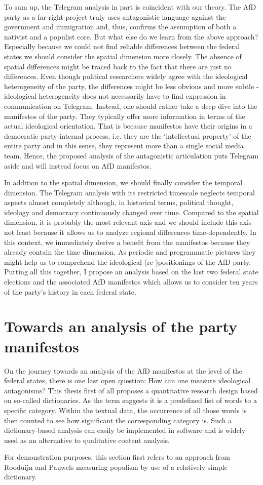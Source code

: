 \documentclass[a4paper]{scrreprt}
\begin{document}
To sum up, the Telegram analysis in part is coincident with our theory. The AfD party as a far-right project truly uses antagonistic language against the government and immigration and, thus, confirms the assumption of both a nativist and a populist core. But what else do we learn from the above approach? Especially because we could not find reliable differences between the federal states we should consider the spatial dimension more closely. The absence of spatial differences might be traced back to the fact that there are just no differences. Even though political researchers widely agree with the ideological heterogeneity of the party, the differences might be less obvious and more subtle - ideological heterogeneity does not necessarily have to find expression in communication on Telegram. Instead, one should rather take a deep dive into the manifestos of the party. They typically offer more information in terms of the actual ideological orientation. \cite[p.~7]{pfahl:2019} That is because manifestos have their origins in a democratic party-internal process, i.e. they are the `intellectual property' of the entire party and in this sense, they represent more than a single social media team. Hence, the proposed analysis of the antagonistic articulation puts Telegram aside and will instead focus on AfD manifestos.\par
In addition to the spatial dimension, we should finally consider the temporal dimension. The Telegram analysis with its restricted timescale neglects temporal aspects almost completely although, in historical terms, political thought, ideology and democracy continuously changed over time. Compared to the spatial dimension, it is probably the most relevant axis and we should include this axis not least because it allows us to analyze regional differences time-dependently. In this context, we immediately derive a benefit from the manifestos because they already contain the time dimension. As periodic and programmatic pictures they might help us to comprehend the ideological (re-)positionings of the AfD party. Putting all this together, I propose an analysis based on the last two federal state elections and the associated AfD manifestos which allows us to consider ten years of the party's history in each federal state.
\section{Towards an analysis of the party manifestos}
On the journey towards an analysis of the AfD manifestos at the level of the federal states, there is one last open question: How can one measure ideological antagonisms? This thesis first of all proposes a quantitative research design based on so-called dictionaries. As the term suggests it is a predefined list of words to a specific category. Within the textual data, the occurrence of all those words is then counted to see how significant the corresponding category is. Such a dictionary-based analysis can easily be implemented in software and is widely used as an alternative to qualitative content analysis.\par
For demonstration purposes, this section first refers to an approach from Rooduijn and Pauwels measuring populism by use of a relatively simple dictionary.
\end{document}

